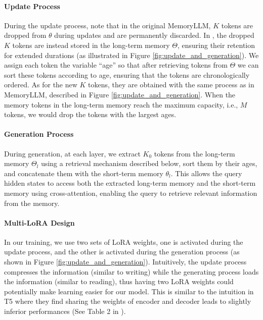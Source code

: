 \vspace{-10pt}
\paragraph{Update Process} During the update process, note that in the original MemoryLLM, $K$ tokens are dropped from $\theta$ during updates and are permanently discarded. In \ours, the dropped $K$ tokens are instead stored in the long-term memory $\Theta$, ensuring their retention for extended durations (as illustrated in Figure \ref{fig:update_and_generation}). We assign each token the variable ``age'' so that after retrieving tokens from $\Theta$ we can sort these tokens according to age, ensuring that the tokens are chronologically ordered. As for the new $K$ tokens, they are obtained with the same process as in MemoryLLM, described in Figure \ref{fig:update_and_generation}. When the memory tokens in the long-term memory reach the maximum capacity, i.e., $M$ tokens, we would drop the tokens with the largest ages.

\vspace{-10pt}
\paragraph{Generation Process} During generation, at each layer, we extract $K_0$ tokens from the long-term memory $\Theta_l$ using a retrieval mechanism described below, sort them by their ages, and concatenate them with the short-term memory $\theta_l$. This allows the query hidden states to access both the extracted long-term memory and the short-term memory using cross-attention, enabling the query to retrieve relevant information from the memory. 

\vspace{-10pt}
\paragraph{Multi-LoRA Design}
In our training, we use two sets of LoRA weights, one is activated during the update process, and the other is activated during the generation process (as shown in Figure \ref{fig:update_and_generation}). Intuitively, the update process compresses the information (similar to writing) while the generating process loads the information (similar to reading), thus having two LoRA weights could potentially make  learning easier for our model. This is similar to the intuition in T5 where they find sharing the weights of encoder and decoder leads to slightly inferior performances (See Table 2 in \citet{T5}). 


